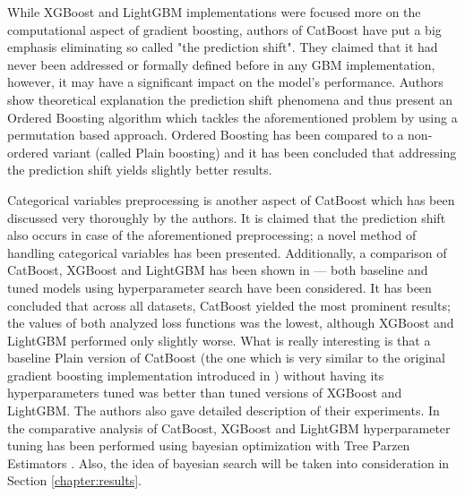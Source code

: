 \documentclass[magisterska, english]{pwr_wmat_praca_dyplomowa}
\theoremstyle{plain}
\numberwithin{theorem}{chapter}
\theoremstyle{definition}
\numberwithin{theorem}{chapter}
\begin{document}
While XGBoost \cite{xgboost} and LightGBM \cite{lightgbm} implementations were focused more on the computational aspect of gradient boosting, authors of CatBoost \cite{catboost} have put a big emphasis eliminating so called "the prediction shift". They claimed that it had never been addressed or formally defined before in any GBM implementation, however, it may have a significant impact on the model's performance. Authors show theoretical explanation the prediction shift phenomena and thus present an Ordered Boosting algorithm which tackles the aforementioned problem by using a permutation based approach. Ordered Boosting has been compared to a non-ordered variant (called Plain boosting) and it has been concluded that addressing the prediction shift yields slightly better results. 

Categorical variables preprocessing is another aspect of CatBoost which has been discussed very thoroughly by the authors. It is claimed that the prediction shift also occurs in case of the aforementioned preprocessing; a novel method of handling categorical variables has been presented. Additionally, a comparison of CatBoost, XGBoost and LightGBM has been shown in \cite{catboost} --- both baseline and tuned models using hyperparameter search have been considered. It has been concluded that across all datasets, CatBoost yielded the most prominent results; the values of both analyzed loss functions was the lowest, although XGBoost and LightGBM performed only slightly worse. What is really interesting is that a baseline Plain version of CatBoost (the one which is very similar to the original gradient boosting implementation introduced in \cite{friedman_gbm}) without having its hyperparameters tuned was better than tuned versions of XGBoost and LightGBM.
The authors also gave detailed description of their experiments. In the comparative analysis of  CatBoost, XGBoost and LightGBM hyperparameter tuning has been performed using bayesian optimization with Tree Parzen Estimators \cite{tpe}. Also, the idea of bayesian search will be taken into consideration in Section \ref{chapter:results}.  %
\end{document}
